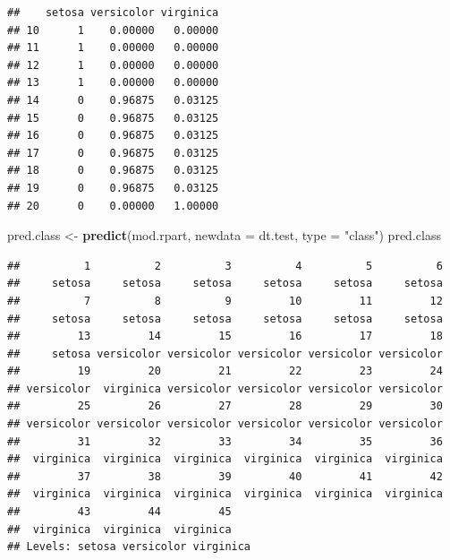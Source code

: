 \documentclass[]{book}
\newenvironment{Shaded}{\begin{snugshade}}{\end{snugshade}}
\newcommand{\DataTypeTok}[1]{\textcolor[rgb]{0.13,0.29,0.53}{#1}}
\newcommand{\KeywordTok}[1]{\textcolor[rgb]{0.13,0.29,0.53}{\textbf{#1}}}
\newcommand{\NormalTok}[1]{#1}
\newcommand{\OperatorTok}[1]{\textcolor[rgb]{0.81,0.36,0.00}{\textbf{#1}}}
\newcommand{\StringTok}[1]{\textcolor[rgb]{0.31,0.60,0.02}{#1}}
\theoremstyle{plain}
\theoremstyle{definition}
\theoremstyle{definition}
\theoremstyle{definition}
\theoremstyle{definition}
\theoremstyle{remark}
\begin{document}
\begin{verbatim}
##    setosa versicolor virginica
## 10      1    0.00000   0.00000
## 11      1    0.00000   0.00000
## 12      1    0.00000   0.00000
## 13      1    0.00000   0.00000
## 14      0    0.96875   0.03125
## 15      0    0.96875   0.03125
## 16      0    0.96875   0.03125
## 17      0    0.96875   0.03125
## 18      0    0.96875   0.03125
## 19      0    0.96875   0.03125
## 20      0    0.00000   1.00000
\end{verbatim}

\begin{Shaded}
\begin{Highlighting}[]
\NormalTok{pred.class <-}\StringTok{ }\KeywordTok{predict}\NormalTok{(mod.rpart, }
                      \DataTypeTok{newdata =}\NormalTok{ dt.test,}
                      \DataTypeTok{type =} \StringTok{"class"}\NormalTok{)}
\NormalTok{pred.class}
\end{Highlighting}
\end{Shaded}

\begin{verbatim}
##          1          2          3          4          5          6 
##     setosa     setosa     setosa     setosa     setosa     setosa 
##          7          8          9         10         11         12 
##     setosa     setosa     setosa     setosa     setosa     setosa 
##         13         14         15         16         17         18 
##     setosa versicolor versicolor versicolor versicolor versicolor 
##         19         20         21         22         23         24 
## versicolor  virginica versicolor versicolor versicolor versicolor 
##         25         26         27         28         29         30 
## versicolor versicolor versicolor versicolor versicolor versicolor 
##         31         32         33         34         35         36 
##  virginica  virginica  virginica  virginica  virginica  virginica 
##         37         38         39         40         41         42 
##  virginica  virginica  virginica  virginica  virginica  virginica 
##         43         44         45 
##  virginica  virginica  virginica 
## Levels: setosa versicolor virginica
\end{verbatim}

\begin{Shaded}
\end{Shaded}
\end{document}
